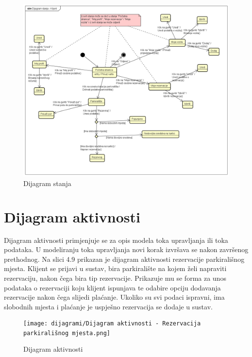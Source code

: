 			\begin{figure}[H]
    			\includegraphics[width=1\linewidth]{dijagrami/Dijagram stanja - Klijent.png}
    			\caption{Dijagram stanja}
    			\label{fig:Dijagram stanja} 
    		\end{figure}
			
			
			\eject 
		
		\section{Dijagram aktivnosti}
			
			Dijagram aktivnosti primjenjuje se za opis modela toka upravljanja ili toka podataka. U modeliranju toka upravljanja novi korak izvršava se nakon završenog prethodnog. Na slici 4.9 prikazan je dijagram aktivnosti rezervacije parkirališnog mjesta. Klijent se prijavi u sustav, bira parkiralište na kojem želi napraviti rezervaciju, nakon čega bira tip rezervacije. Prikazuje mu se forma za unos podataka o rezervaciji koju klijent ispunjava te odabire opciju dodavanja rezervacije nakon čega slijedi plaćanje. Ukoliko su svi podaci ispravni, ima slobodnih mjesta i plaćanje je uspješno rezervacija se dodaje u sustav.
			
			 \begin{figure}[H]
    			\texttt{[image: dijagrami/Dijagram aktivnosti - Rezervacija parkirališnog mjesta.png]}
    			\caption{Dijagram aktivnosti}
    			\label{fig:Dijagram aktivnosti} 
    		\end{figure}
			
